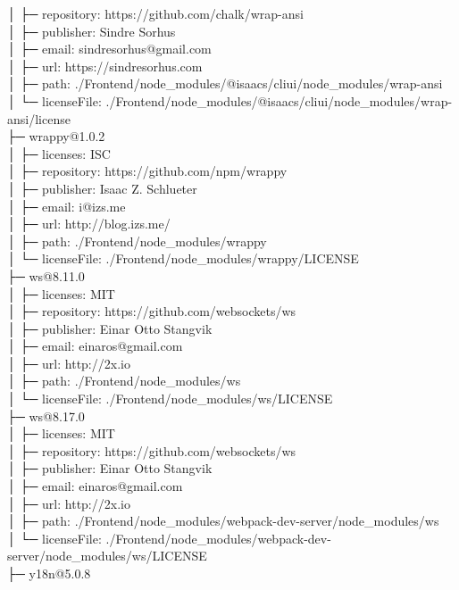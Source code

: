 \documentclass[
    paper=a4,
    twoside=false,
    parskip=half,
    listof=entryprefix,
    listof=totoc,
    index=totoc,
    bibliography=totoc,
    headsepline,
]{scrbook}
\begin{document}
    │  ├─ repository: https://github.com/chalk/wrap-ansi\\
    │  ├─ publisher: Sindre Sorhus\\
    │  ├─ email: sindresorhus@gmail.com\\
    │  ├─ url: https://sindresorhus.com\\
    │  ├─ path: ./Frontend/node\_modules/@isaacs/cliui/node\_modules/wrap-ansi\\
    │  └─ licenseFile: ./Frontend/node\_modules/@isaacs/cliui/node\_modules/wrap-ansi/license\\
    ├─ wrappy@1.0.2\\
    │  ├─ licenses: ISC\\
    │  ├─ repository: https://github.com/npm/wrappy\\
    │  ├─ publisher: Isaac Z. Schlueter\\
    │  ├─ email: i@izs.me\\
    │  ├─ url: http://blog.izs.me/\\
    │  ├─ path: ./Frontend/node\_modules/wrappy\\
    │  └─ licenseFile: ./Frontend/node\_modules/wrappy/LICENSE\\
    ├─ ws@8.11.0\\
    │  ├─ licenses: MIT\\
    │  ├─ repository: https://github.com/websockets/ws\\
    │  ├─ publisher: Einar Otto Stangvik\\
    │  ├─ email: einaros@gmail.com\\
    │  ├─ url: http://2x.io\\
    │  ├─ path: ./Frontend/node\_modules/ws\\
    │  └─ licenseFile: ./Frontend/node\_modules/ws/LICENSE\\
    ├─ ws@8.17.0\\
    │  ├─ licenses: MIT\\
    │  ├─ repository: https://github.com/websockets/ws\\
    │  ├─ publisher: Einar Otto Stangvik\\
    │  ├─ email: einaros@gmail.com\\
    │  ├─ url: http://2x.io\\
    │  ├─ path: ./Frontend/node\_modules/webpack-dev-server/node\_modules/ws\\
    │  └─ licenseFile: ./Frontend/node\_modules/webpack-dev-server/node\_modules/ws/LICENSE\\
    ├─ y18n@5.0.8\\
\end{document}
